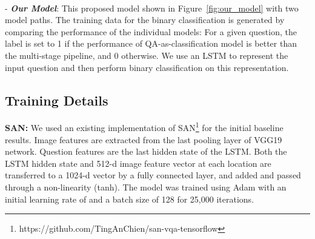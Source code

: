 \documentclass[10pt,twocolumn,letterpaper]{article}
\begin{document}
\\
\noindent - \textit{\textbf{Our Model}}:  This proposed model shown in Figure~\ref{fig:our_model} with two model paths.
The training data for the binary classification is generated by comparing the performance of the individual models: For a given question, the label is set to 1 if the performance of QA-as-classification model is better than the multi-stage pipeline, and 0 otherwise. 
       We use an LSTM to represent the input question and then perform binary classification on this representation.









\subsection{Training Details}





\noindent\textbf{SAN:} We used an existing implementation of SAN\footnote{https://github.com/TingAnChien/san-vqa-tensorflow} for the initial baseline results. Image features are extracted from the last pooling layer of VGG19 network. Question features are the last hidden state of the LSTM. Both the LSTM hidden state and 512-d image feature vector at each location are transferred to a 1024-d vector by a fully connected layer, and added and passed through a non-linearity (tanh). The model was trained using Adam \cite{Adam} with an initial learning rate of  and a batch size of 128 for 25,000 iterations.
\end{document}
